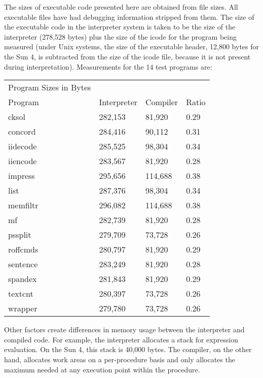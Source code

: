 The sizes of executable code presented here are obtained from file
sizes. All executable files have had debugging information stripped
from them. The size of the executable code in the interpreter system
is taken to be the size of the interpreter (278,528 bytes) plus the
size of the icode for the program being measured (under Unix systems,
the size of the executable header, 12,800 bytes for the Sun 4, is
subtracted from the size of the icode file, because it is not present
during interpretation). Measurements for the 14 test programs are:

\begin{center}
\tablefirsthead{}
\tablehead{}
\tabletail{}
\tablelasttail{}
\begin{xtabular}{m{1.5740598in}m{0.68795985in}m{0.60525984in}m{0.34695986in}}
 Program Sizes in Bytes &
~
 &
~
 &
~
\\
 Program &
 Interpreter &
 Compiler &
 Ratio\\
 cksol  &
 282,153  &
 81,920  &
 0.29 \\
 concord  &
 284,416  &
 90,112  &
 0.31 \\
 iidecode  &
 285,525  &
 98,304  &
 0.34 \\
 iiencode  &
 283,567  &
 81,920  &
 0.28 \\
 impress  &
 295,656  &
 114,688  &
 0.38 \\
 list  &
 287,376  &
 98,304  &
 0.34 \\
 memfiltr  &
 296,082  &
 114,688  &
 0.38 \\
 mf  &
 282,739  &
 81,920  &
 0.28 \\
 pssplit  &
 279,709  &
 73,728  &
 0.26 \\
 roffcmds  &
 280,797  &
 81,920  &
 0.29 \\
 sentence  &
 283,249  &
 81,920  &
 0.28 \\
 spandex  &
 281,843  &
 81,920  &
 0.29 \\
 textcnt  &
 280,397  &
 73,728  &
 0.26 \\
 wrapper  &
 279,780  &
 73,728  &
 0.26 \\
\end{xtabular}
\end{center}

Other factors create differences in memory usage between the
interpreter and compiled code. For example, the interpreter allocates
a stack for expression evaluation. On the Sun 4, this stack is 40,000
bytes. The compiler, on the other hand, allocates work areas on a
per-procedure basis and only allocates the maximum needed at any
execution point within the procedure.
